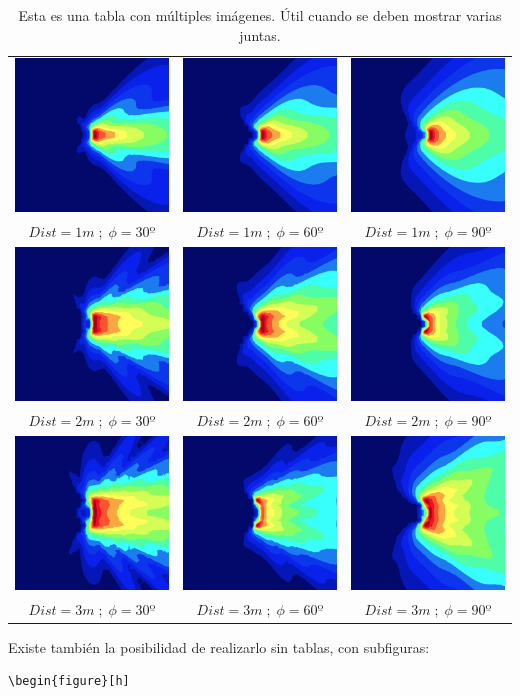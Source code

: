 \begin{table}[h]
\centering
\begin{tabular}{ccc}
\includegraphics[scale=0.2]{archivos/130} & \includegraphics[scale=0.2]{archivos/160} & \includegraphics[scale=0.2]{archivos/190} \\
$Dist=1m \; ; \; \phi=30º$  & $Dist=1m \; ; \; \phi=60º$  & $Dist=1m \; ; \; \phi=90º$  \\
\includegraphics[scale=0.2]{archivos/230} & \includegraphics[scale=0.2]{archivos/260} & \includegraphics[scale=0.2]{archivos/290} \\
$Dist=2m \; ; \; \phi=30º$  & $Dist=2m \; ; \; \phi=60º$  & $Dist=2m \; ; \; \phi=90º$  \\
\includegraphics[scale=0.2]{archivos/330} & \includegraphics[scale=0.2]{archivos/360} & \includegraphics[scale=0.2]{archivos/390} \\
$Dist=3m \; ; \; \phi=30º$  & $Dist=3m \; ; \; \phi=60º$  & $Dist=3m \; ; \; \phi=90º$ \\
\end{tabular}
\caption{Esta es una tabla con múltiples imágenes. Útil cuando se deben mostrar varias juntas.}
\label{multiimagen} %
\end{table}

Existe también la posibilidad de realizarlo sin tablas, con subfiguras:
\begin{lstlisting}[style=Latex-color]
\begin{figure}[h]
    
\end{lstlisting}

